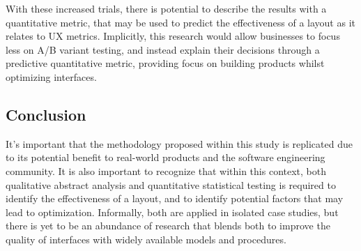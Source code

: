 \documentclass[conference]{IEEEtran}
\begin{document}
With these increased trials, there is potential to describe the results with a quantitative metric, that may be used to predict the effectiveness of a layout as it relates to UX metrics. Implicitly, this research would allow businesses to focus less on A/B variant testing, and instead explain their decisions through a predictive quantitative metric, providing focus on building products whilst optimizing interfaces.

\subsection{Conclusion}
It's important that the methodology proposed within this study is replicated due to its potential benefit to real-world products and the software engineering community. It is also important to recognize that within this context, both qualitative abstract analysis and quantitative statistical testing is required to identify the effectiveness of a layout, and to identify potential factors that may lead to optimization. Informally, both are applied in isolated case studies, but there is yet to be an abundance of research that blends both to improve the quality of interfaces with widely available models and procedures.



\end{document}
